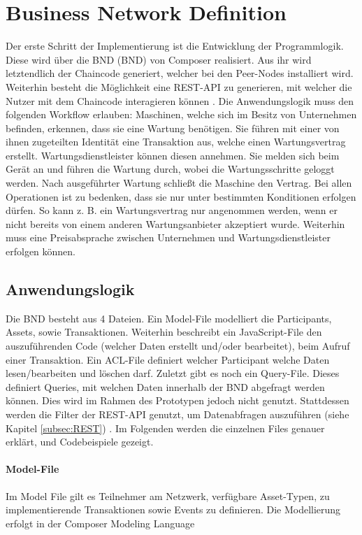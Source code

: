 \section{Business Network Definition}
Der erste Schritt der Implementierung ist die Entwicklung der Programmlogik. Diese wird über die \acl{BND} (\acs{BND}) von Composer realisiert. Aus ihr wird letztendlich der Chaincode generiert, welcher bei den Peer-Nodes installiert wird. Weiterhin besteht die Möglichkeit eine REST-API zu generieren, mit welcher die Nutzer mit dem Chaincode interagieren können \cite{HyperledgerComposerTeamDeveloperTutorialHyperledger}. Die Anwendungslogik muss den folgenden Workflow erlauben: Maschinen, welche sich im Besitz von Unternehmen befinden, erkennen, dass sie eine Wartung benötigen. Sie führen mit einer von ihnen zugeteilten Identität eine Transaktion aus, welche einen Wartungsvertrag erstellt. Wartungsdienstleister können diesen annehmen. Sie melden sich beim Gerät an und führen die Wartung durch, wobei die Wartungsschritte geloggt werden. Nach ausgeführter Wartung schließt die Maschine den Vertrag. Bei allen Operationen ist zu bedenken, dass sie nur unter bestimmten Konditionen erfolgen dürfen. So kann z. B. ein Wartungsvertrag nur angenommen werden, wenn er nicht bereits von einem anderen Wartungsanbieter akzeptiert wurde. Weiterhin muss eine Preisabsprache zwischen Unternehmen und Wartungsdienstleister erfolgen können. 

\subsection{Anwendungslogik}
Die \acs{BND} besteht aus 4 Dateien. Ein Model-File modelliert die Participants, Assets, sowie Transaktionen. Weiterhin beschreibt ein JavaScript-File den auszuführenden Code (welcher Daten erstellt und/oder bearbeitet), beim Aufruf einer Transaktion. Ein ACL-File definiert welcher Participant welche Daten lesen/bearbeiten und löschen darf. Zuletzt gibt es noch ein Query-File. Dieses definiert Queries, mit welchen Daten innerhalb der \acs{BND} abgefragt werden können. Dies wird im Rahmen des Prototypen jedoch nicht genutzt. Stattdessen werden die Filter der REST-API genutzt, um Datenabfragen auszuführen (siehe Kapitel \ref{subsec:REST}) \cite{HyperledgerComposerTeamIntroductionHyperledgerComposer}. Im Folgenden werden die einzelnen Files genauer erklärt, und Codebeispiele gezeigt.

\paragraph{Model-File}
Im Model File gilt es Teilnehmer am Netzwerk, verfügbare Asset-Typen, zu implementierende Transaktionen sowie Events zu definieren. Die Modellierung erfolgt in der Composer Modeling Language \cite{HyperledgerComposerTeamModelingLanguageHyperledger}

